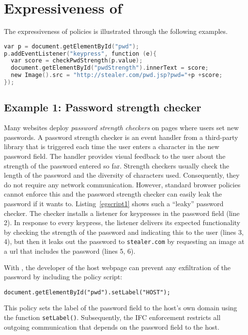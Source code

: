\section{Expressiveness of {\sys}}
\label{sec:examples}

The expressiveness of {\sys} policies is illustrated through the
following examples.

\begin{lstlisting}[float, caption=Password strength checking script that leaks the password,label=egscript1,language=C]
var p = document.getElementById("pwd");
p.addEventListener("keypress", function (e){
  var score = checkPwdStrength(p.value);
  document.getElementById("pwdStrength").innerText = score; 
  new Image().src = "http://stealer.com/pwd.jsp?pwd="+p +score;
});
\end{lstlisting}

\subsection{Example 1: Password strength checker}  
Many websites deploy \emph{password strength checkers} on pages where
users set new passwords. A password strength checker is an event
handler from a third-party library that is triggered each time the
user enters a character in the new password field. The handler
provides visual feedback to the user about the strength of the
password entered so far. Strength checkers usually check the length of
the password and the diversity of characters used. Consequently, they
do not require any network communication. However, standard browser
policies cannot enforce this and the password strength checker can
easily leak the password if it wants to. Listing~\ref{egscript1} shows
such a ``leaky'' password checker. The checker installs a listener for 
keypresses in the password field (line 2). In response to every
keypress, the listener delivers its expected functionality by checking
the strength of the password and indicating this to the user (lines 3,
4), but then it leaks out the password to \texttt{stealer.com} by
requesting an image at a url that includes the password (lines 5, 6). 

With {\sys}, the developer of the host webpage can prevent any
exfiltration of the password by including the policy script:

\medskip
\texttt{document.getElementById("pwd").setLabel("HOST");}

\medskip 
\noindent This policy sets the label of the password field to the
host's own domain using the function
\texttt{setLabel()}. Subsequently, the IFC enforcement restricts all
outgoing communication that depends on the password field to the host.

